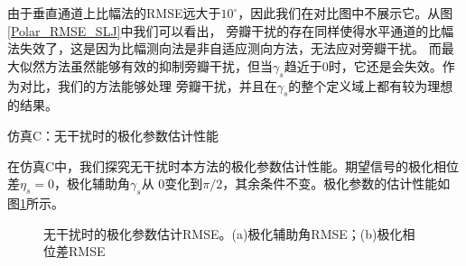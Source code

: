 \documentclass[master]{thesis-uestc}
\begin{document}
由于垂直通道上比幅法的RMSE远大于$10^\circ$，因此我们在对比图中不展示它。从图\ref{Polar_RMSE_SLJ}中我们可以看出，
旁瓣干扰的存在同样使得水平通道的比幅法失效了，这是因为比幅测向法是非自适应测向方法，无法应对旁瓣干扰。
而最大似然方法虽然能够有效的抑制旁瓣干扰，但当$\gamma_s$趋近于0时，它还是会失效。作为对比，我们的方法能够处理
旁瓣干扰，并且在$\gamma_s$的整个定义域上都有较为理想的结果。

仿真C：无干扰时的极化参数估计性能

在仿真C中，我们探究无干扰时本方法的极化参数估计性能。期望信号的极化相位差$\eta_s=0$，极化辅助角$\gamma_s$从
$0$变化到$\pi/2$，其余条件不变。极化参数的估计性能如图\ref{Polar_args_RMSE}所示。
\begin{figure}[h]
    \floatcontinue
    \caption{无干扰时的极化参数估计RMSE。(a)极化辅助角RMSE；(b)极化相位差RMSE}
    \label{Polar_args_RMSE}
\end{figure}
\end{document}
